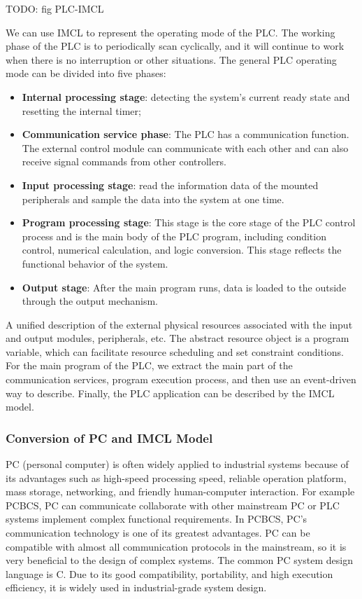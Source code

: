 TODO: fig PLC-IMCL

We can use IMCL to represent the operating mode of the PLC. The working phase of the PLC is to periodically scan cyclically, and it will continue to work when there is no interruption or other situations. The general PLC operating mode can be divided into five phases:

\begin{itemize}
  \item \textbf{Internal processing stage}: detecting the system's current ready state and resetting the internal timer;
  \item \textbf{Communication service phase}: The PLC has a communication function. The external control module can communicate with each other and can also receive signal commands from other controllers.
  \item \textbf{Input processing stage}: read the information data of the mounted peripherals and sample the data into the system at one time.
  \item \textbf{Program processing stage}: This stage is the core stage of the PLC control process and is the main body of the PLC program, including condition control, numerical calculation, and logic conversion. This stage reflects the functional behavior of the system.
  \item \textbf{Output stage}: After the main program runs, data is loaded to the outside through the output mechanism.
\end{itemize}

A unified description of the external physical resources associated with the input and output modules, peripherals, etc. The abstract resource object is a program variable, which can facilitate resource scheduling and set constraint conditions. For the main program of the PLC, we extract the main part of the communication services, program execution process, and then use an event-driven way to describe. Finally, the PLC application can be described by the IMCL model.

\subsubsection{Conversion of PC and IMCL Model}
PC (personal computer) is often widely applied to industrial systems because of its advantages such as high-speed processing speed, reliable operation platform, mass storage, networking, and friendly human-computer interaction. For example PCBCS, PC can communicate collaborate with other mainstream PC or PLC systems implement complex functional requirements. In PCBCS, PC's communication technology is one of its greatest advantages. PC can be compatible with almost all communication protocols in the mainstream, so it is very beneficial to the design of complex systems. The common PC system design language is C. Due to its good compatibility, portability, and high execution efficiency, it is widely used in industrial-grade system design.

